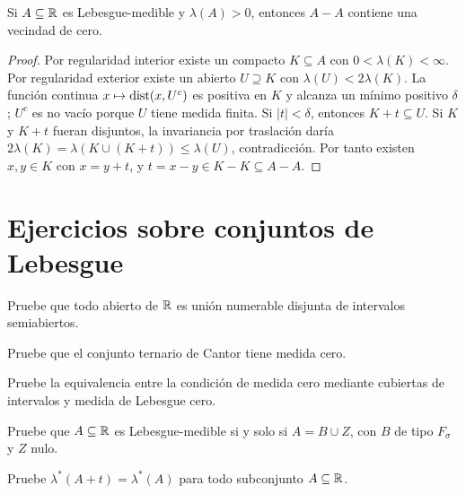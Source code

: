 \begin{teorema}[Steinhaus]\label{teo:v2-steinhaus}
Si $A\subseteq\mathbb R$ es Lebesgue-medible y $\lambda(A)>0$, entonces $A-A$ contiene una vecindad de cero.
\end{teorema}
\begin{proof}
Por regularidad interior existe un compacto $K\subseteq A$ con $0<\lambda(K)<\infty$. Por regularidad exterior existe un abierto $U\supseteq K$ con $\lambda(U)<2\lambda(K)$. La función continua $x\mapsto\operatorname{dist}(x,U^c)$ es positiva en $K$ y alcanza un mínimo positivo $\delta$; $U^c$ es no vacío porque $U$ tiene medida finita. Si $|t|<\delta$, entonces $K+t\subseteq U$. Si $K$ y $K+t$ fueran disjuntos, la invariancia por traslación daría $2\lambda(K)=\lambda(K\cup(K+t))\le\lambda(U)$, contradicción. Por tanto existen $x,y\in K$ con $x=y+t$, y $t=x-y\in K-K\subseteq A-A$.
\end{proof}

\section{Ejercicios sobre conjuntos de Lebesgue}
\begin{ejercicio}\label{ej:v2-l06-1}
Pruebe que todo abierto de $\mathbb R$ es unión numerable disjunta de intervalos semiabiertos.
\end{ejercicio}

\begin{ejercicio}\label{ej:v2-l06-2}
Pruebe que el conjunto ternario de Cantor tiene medida cero.
\end{ejercicio}

\begin{ejercicio}\label{ej:v2-l06-3}
Pruebe la equivalencia entre la condición de medida cero mediante cubiertas de intervalos y medida de Lebesgue cero.
\end{ejercicio}

\begin{ejercicio}\label{ej:v2-l06-4}
Pruebe que $A\subseteq\mathbb R$ es Lebesgue-medible si y solo si $A=B\cup Z$, con $B$ de tipo $F_\sigma$ y $Z$ nulo.
\end{ejercicio}

\begin{ejercicio}\label{ej:v2-l06-5}
Pruebe $\lambda^*(A+t)=\lambda^*(A)$ para todo subconjunto $A\subseteq\mathbb R$.
\end{ejercicio}

